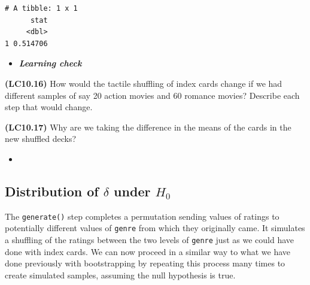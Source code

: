 \documentclass[12pt, krantz2,]{krantz}
\makeatletter
\newenvironment{Shaded}{\begin{snugshade}}{\end{snugshade}}
\newcommand{\DataTypeTok}[1]{\textcolor[rgb]{0.27,0.27,0.27}{#1}}
\newcommand{\DecValTok}[1]{\textcolor[rgb]{0.06,0.06,0.06}{#1}}
\newcommand{\KeywordTok}[1]{\textcolor[rgb]{0.27,0.27,0.27}{\textbf{#1}}}
\newcommand{\NormalTok}[1]{#1}
\newcommand{\OperatorTok}[1]{\textcolor[rgb]{0.43,0.43,0.43}{\textbf{#1}}}
\newcommand{\StringTok}[1]{\textcolor[rgb]{0.5,0.5,0.5}{#1}}
\newenvironment{kframe}{%
\medskip{}
\setlength{\fboxsep}{.8em}
 \def\at@end@of@kframe{}%
 \ifinner\ifhmode%
  \def\at@end@of@kframe{\end{minipage}}%
  \begin{minipage}{\columnwidth}%
 \fi\fi%
 \def\FrameCommand##1{\hskip\@totalleftmargin \hskip-\fboxsep
 \colorbox{shadecolor}{##1}\hskip-\fboxsep
     \hskip-\linewidth \hskip-\@totalleftmargin \hskip\columnwidth}%
 \MakeFramed {\advance\hsize-\width
   \@totalleftmargin\z@ \linewidth\hsize
   \@setminipage}}%
 {\par\unskip\endMakeFramed%
 \at@end@of@kframe}
\renewenvironment{Shaded}{\begin{kframe}}{\end{kframe}}
\newenvironment{rmdblock}[1]
  {\begin{shaded*}
  \begin{itemize}
  \renewcommand{\labelitemi}{
    \raisebox{-.7\height}[0pt][0pt]{
    }
  }
  \item
  }
  {
  \end{itemize}
  \end{shaded*}
  }
\newenvironment{learncheck}
  {\begin{rmdblock}{warning}}
  {\end{rmdblock}}
\makeatother
\begin{document}
\begin{Shaded}
\end{Shaded}

\begin{verbatim}
# A tibble: 1 x 1
      stat
     <dbl>
1 0.514706
\end{verbatim}

\begin{learncheck}
\textbf{\emph{Learning check}}
\end{learncheck}

\textbf{(LC10.16)} How would the tactile shuffling of index cards change if we had different samples of say 20 action movies and 60 romance movies? Describe each step that would change.

\textbf{(LC10.17)} Why are we taking the difference in the means of the cards in the new shuffled decks?

\begin{learncheck}

\end{learncheck}

\hypertarget{distribution-of-delta-under-h_0}{%
\subsection{\texorpdfstring{Distribution of \(\delta\) under \(H_0\)}{Distribution of \textbackslash{}delta under H\_0}}\label{distribution-of-delta-under-h_0}}

The \texttt{generate()} step completes a permutation sending values of ratings to potentially different values of \texttt{genre} from which they originally came. It simulates a shuffling of the ratings between the two levels of \texttt{genre} just as we could have done with index cards. We can now proceed in a similar way to what we have done previously with bootstrapping by repeating this process many times to create simulated samples, assuming the null hypothesis is true.
\end{document}
